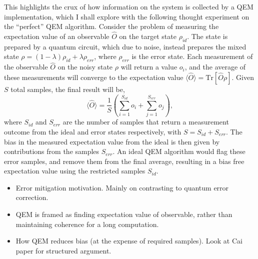 This highlights the crux of how information on the system is collected by a QEM implementation, which I shall explore with the following thought experiment on the ``perfect'' QEM algorithm.
Consider the problem of measuring the expectation value of an observable $\hat{O}$ on the target state $\rho_{id}$. The state is prepared by a quantum circuit, which due to noise, instead prepares the mixed state $\rho = (1-\lambda) \rho_{id} + \lambda \rho_{err}$, where $\rho_{err}$ is the error state. Each measurement of the observable $\hat{O}$ on the noisy state $\rho$ will return a value $o_i$, and the average of these measurements will converge to the expectation value $\langle \hat{O} \rangle = \mathrm{Tr}[\hat{O}\rho]$. Given $S$ total samples, the final result will be,
$$ \langle \hat{O} \rangle = \frac{1}{S} \left(\sum_{i=1}^{S_{id}} o_i + \sum_{j=1}^{S_{err}} o_j\right),$$
where $S_{id}$ and $S_{err}$ are the number of samples that return a measurement outcome from the ideal and error states respectively, with $S = S_{id} + S_{err}$. The bias in the measured expectation value from the ideal is then given by contributions from the samples $S_{err}$. An ideal QEM algorithm would flag these error samples, and remove them from the final average, resulting in a bias free expectation value using the restricted samples $S_{id}$.


\begin{itemize}
    \item Error mitigation motivation. Mainly on contrasting to quantum error correction.
        \item QEM is framed as finding expectation value of observable, rather than maintaining coherence for a long computation.
        \item How QEM reduces bias (at the expense of required samples). Look at Cai paper for structured argument.
\end{itemize}

